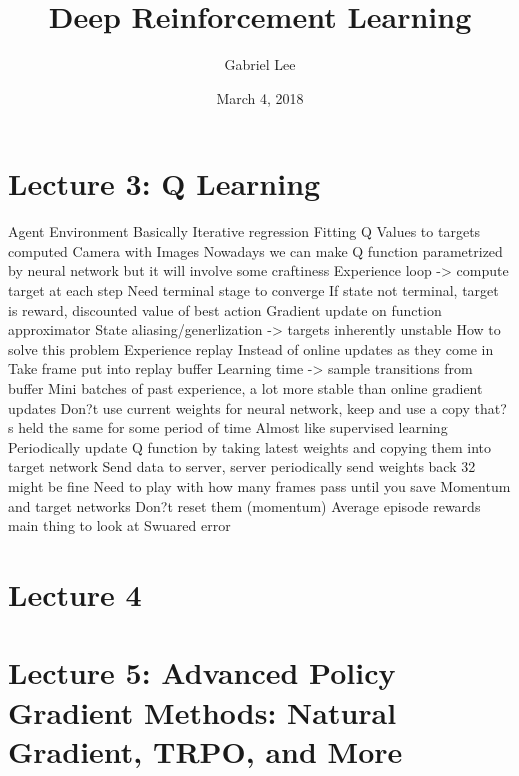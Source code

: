 \documentclass[12pt]{book}
\begin{document}
\title{Deep Reinforcement Learning}
\author{Gabriel Lee}
\date{March 4, 2018}
\maketitle

\chapter{Lecture 3: Q Learning}


Agent
Environment
Basically Iterative regression
Fitting Q Values to targets computed
Camera with Images
Nowadays we can make Q function parametrized by neural network but it will involve some craftiness
Experience loop -> compute target at each step
Need terminal stage to converge
If state not terminal, target is reward, discounted value of best action
Gradient update on function approximator
State aliasing/generlization -> targets inherently unstable
How to solve this problem
Experience replay
Instead of online updates as they come in
Take frame put into replay buffer
Learning time -> sample transitions from buffer
Mini batches of past experience, a lot more stable than online gradient updates
Don?t use current weights for neural network, keep and use a copy that?s held the same for some period of time
Almost like supervised learning
Periodically update Q function by taking latest weights and copying them into target network
Send data to server, server periodically send weights back
32 might be fine
Need to play with how many frames pass until you save
Momentum and target networks
Don?t reset them (momentum) 
Average episode rewards main thing to look at 
Swuared error


\chapter{Lecture 4}

\chapter{Lecture 5: Advanced Policy Gradient Methods: Natural Gradient, TRPO, and More}
\end{document}
